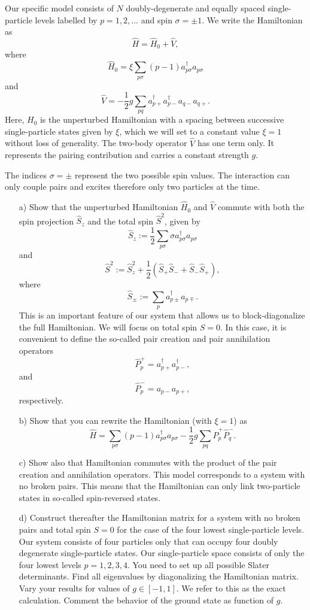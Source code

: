 \begin{prob}
  Our specific model consists of $N$ doubly-degenerate and equally
  spaced single-particle levels labelled by $p=1,2,\dots$ and spin
  $\sigma=\pm 1$.  
  We write the Hamiltonian as
  \[ \hat{H} = \hat{H}_0 + \hat{V} , \]
  where
  \[
  \hat{H}_0=\xi\sum_{p\sigma}(p-1)a_{p\sigma}^{\dagger}a_{p\sigma}
  \]
  and
  \[
  \hat{V}=-\frac{1}{2}g\sum_{pq}a^{\dagger}_{p+}
  a^{\dagger}_{p-}a_{q-}a_{q+}.
  \]
  Here, $H_0$ is the unperturbed Hamiltonian with a spacing between
  successive single-particle states given by $\xi$, which we will set
  to a constant value $\xi=1$ without loss of generality. The two-body
  operator $\hat{V}$ has one term only. It represents the pairing
  contribution and carries a constant strength $g$.

  The indices $\sigma=\pm$ represent the two possible spin values. The
  interaction can only couple pairs and excites therefore only two
  particles at the time.


  \begin{enumerate}
  \item[a)] Show that the unperturbed Hamiltonian $\hat{H}_0$ and
    $\hat{V}$ commute with both the spin projection $\hat{S}_z$ and
    the total spin $\hat{S}^2$, given by
  \[
    \hat{S}_z := \frac{1}{2}\sum_{p\sigma} \sigma
    a^{\dagger}_{p\sigma}a_{p\sigma}
  \]
  and
  \[
    \hat{S}^2 := \hat{S}_z^2 + \frac{1}{2}(\hat{S}_+\hat{S}_- +
    \hat{S}_-\hat{S}_+),
  \]
  where
  \[
    \hat{S}_\pm := \sum_{p} a^{\dagger}_{p\pm} a_{p\mp}.
  \]
  This is an important feature of our system that allows us to
  block-diagonalize the full Hamiltonian. We will focus on total spin
  $S=0$.  In this case, it is convenient to define the so-called pair
  creation and pair annihilation operators
  \[
  \hat{P}^{+}_p = a^{\dagger}_{p+}a^{\dagger}_{p-},
  \]
  and
  \[
  \hat{P}^{-}_p = a_{p-}a_{p+},
  \]
  respectively.
  \item[b)] Show that you can rewrite the Hamiltonian (with $\xi=1$)
    as
  \[
  \hat{H}=\sum_{p\sigma}(p-1)a_{p\sigma}^{\dagger}a_{p\sigma}
  -\frac{1}{2}g\sum_{pq}\hat{P}^{+}_p\hat{P}^{-}_q.
  \]
  \item[c)] Show also that Hamiltonian commutes with the product of
    the pair creation and annihilation operators.  This model
    corresponds to a system with no broken pairs. This means that the
    Hamiltonian can only link two-particle states in so-called
    spin-reversed states.

  \item[d)] Construct thereafter the Hamiltonian matrix for a system
    with no broken pairs and total spin $S=0$ for the case of the four
    lowest single-particle levels. Our system consists of four particles
    only that can occupy four doubly degenerate single-particle states.  
Our single-particle space consists of only the four lowest
    levels $p=1,2,3,4$.  You need to set up all possible Slater
    determinants.  Find all eigenvalues by diagonalizing the
    Hamiltonian matrix.  Vary your results for values of $g\in
    [-1,1]$.  We refer to this as the exact calculation. Comment the
    behavior of the ground state as function of $g$.
  \end{enumerate}
  \end{prob}
